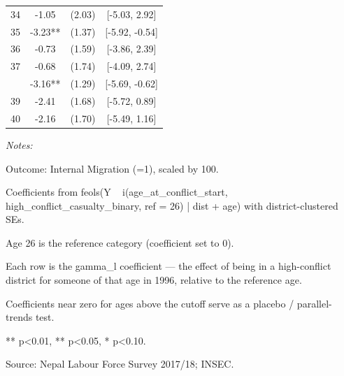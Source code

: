 \begin{table}[!h]
\begin{threeparttable}
\begin{tabular}[t]{cccc}
34 & -1.05 & (2.03) & {}[-5.03, 2.92]\\
35 & -3.23** & (1.37) & {}[-5.92, -0.54]\\
36 & -0.73 & (1.59) & {}[-3.86, 2.39]\\
37 & -0.68 & (1.74) & {}[-4.09, 2.74]\\
\addlinespace
38 & -3.16** & (1.29) & {}[-5.69, -0.62]\\
39 & -2.41 & (1.68) & {}[-5.72, 0.89]\\
40 & -2.16 & (1.70) & {}[-5.49, 1.16]\\
\bottomrule
\end{tabular}
\begin{tablenotes}
\item \textit{Notes:} 
\item Outcome: Internal Migration (=1), scaled by 100.
\item Coefficients from feols(Y ~ i(age_at_conflict_start, high_conflict_casualty_binary, ref = 26) | dist + age) with district-clustered SEs.
\item Age 26 is the reference category (coefficient set to 0).
\item Each row is the gamma_l coefficient — the effect of being in a high-conflict district for someone of that age in 1996, relative to the reference age.
\item Coefficients near zero for ages above the cutoff serve as a placebo / parallel-trends test.
\item *** p<0.01, ** p<0.05, * p<0.10.
\item Source: Nepal Labour Force Survey 2017/18; INSEC.
\end{tablenotes}
\end{threeparttable}
\end{table}
